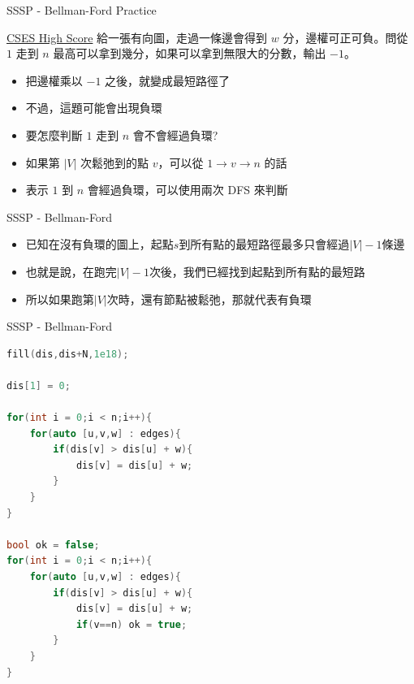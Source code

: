 \documentclass[aspectratio=169]{beamer}
\begin{document}
    \begin{frame}{SSSP - Bellman-Ford Practice}
        \begin{block}{\href{https://cses.fi/problemset/task/1673}{CSES High Score}}
        給一張有向圖，走過一條邊會得到 $w$ 分，邊權可正可負。問從 $1$ 走到 $n$ 最高可以拿到幾分，如果可以拿到無限大的分數，輸出 $-1$。
        \end{block}
        \begin{itemize}
            \item<2-> 把邊權乘以 $-1$ 之後，就變成最短路徑了
            \item<3-> 不過，這題可能會出現負環
            \item<4-> 要怎麼判斷 $1$ 走到 $n$ 會不會經過負環?
            \item<5-> 如果第 $|V|$ 次鬆弛到的點 $v$，可以從 $1 \rightarrow v \rightarrow n$ 的話
            \item<5-> 表示 $1$ 到 $n$ 會經過負環，可以使用兩次 DFS 來判斷
        \end{itemize}
    \end{frame}
    
    \begin{frame}{SSSP - Bellman-Ford}
        \begin{itemize}
            \item 已知在沒有負環的圖上，起點$s$到所有點的最短路徑最多只會經過$|V|-1$條邊
            \item<2-> 也就是說，在跑完$|V|-1$次後，我們已經找到起點到所有點的最短路
            \item<3-> 所以如果跑第$|V|$次時，還有節點被鬆弛，那就代表有負環
        \end{itemize}
    \end{frame}
    
    \begin{frame}[fragile]{SSSP - Bellman-Ford}
        \begin{lstlisting}[language=C++, basicstyle=\ttfamily\tiny]
fill(dis,dis+N,1e18);

dis[1] = 0;

for(int i = 0;i < n;i++){
    for(auto [u,v,w] : edges){
        if(dis[v] > dis[u] + w){
            dis[v] = dis[u] + w;
        }
    }
}

bool ok = false;
for(int i = 0;i < n;i++){
    for(auto [u,v,w] : edges){
        if(dis[v] > dis[u] + w){
            dis[v] = dis[u] + w;
            if(v==n) ok = true;
        }
    }
}
        \end{lstlisting}
    \end{frame}
    
\end{document}
